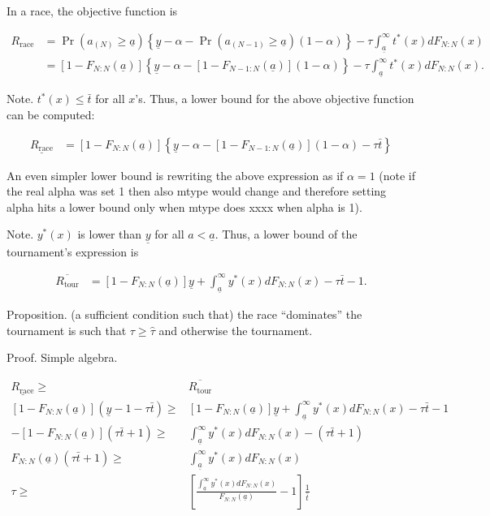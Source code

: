 \documentclass[12pt,]{article}
\newcommand\deadline{\bar{t}}
\newcommand\target{\underline{y}}
\newcommand\race{\text{race}}
\newcommand\tournament{\text{tour}}
\newcommand\mtype{\underline{a}}
\begin{document}
In a race, the objective function is

\begin{align}
R_\race & =  
  \Pr(a_{(N)}\geq \mtype) \left\{\target - \alpha -
  \Pr(a_{(N-1)}\geq \mtype) (1-\alpha) \right\}
  - \tau \int_{\mtype}^{\infty} t^*(x) dF_{N:N}(x) \nonumber\\
  & = [1-F_{N:N}(\mtype)] \left\{\target - \alpha -
  [1-F_{N-1:N}(\mtype)] (1 - \alpha) \right\}
  - \tau \int_{\mtype}^{\infty} t^*(x) dF_{N:N}(x).
\end{align}

Note. \(t^*(x) \leq \deadline\) for all \(x\)'s. Thus, a lower bound for
the above objective function can be computed:

\begin{align}
\underline {R_\race} & = 
  [1-F_{N:N}(\mtype)] \left\{\target - \alpha -
  [1-F_{N-1:N}(\mtype)] (1 - \alpha) - \tau \deadline\right\}
\end{align}

An even simpler lower bound is rewriting the above expression as if
\(\alpha=1\) (note if the real alpha was set 1 then also mtype would
change and therefore setting alpha hits a lower bound only when mtype
does xxxx when alpha is 1).

Note. \(y^*(x)\) is lower than \(\target\) for all \(a < \mtype\). Thus,
a lower bound of the tournament's expression is

\begin{align}
\overline {R_\tournament} & = 
  [1-F_{N:N}(\mtype)] \target + \int_{\mtype}^\infty y^*(x) dF_{N:N}(x) 
  - \tau \deadline - 1. 
\end{align}

Proposition. (a sufficient condition such that) the race ``dominates''
the tournament is such that \(\tau \geq \hat \tau\) and otherwise the
tournament.

Proof. Simple algebra.

\begin{align}
  \underline {R_\race} \geq & \overline {R_\tournament} \nonumber\\
  [1-F_{N:N}(\mtype)] (\target - 1 - \tau \deadline) \geq &
  [1-F_{N:N}(\mtype)] \target + \int_{\mtype}^\infty y^*(x) dF_{N:N}(x) 
  - \tau \deadline - 1 \nonumber\\
  - [1-F_{N:N}(\mtype)] (\tau\deadline + 1) \geq &
  \int_{\mtype}^\infty y^*(x) dF_{N:N}(x) 
  - (\tau \deadline + 1) \nonumber\\
  F_{N:N}(\mtype) (\tau \deadline + 1) \geq &
  \int_{\mtype}^\infty y^*(x) dF_{N:N}(x) \nonumber\\
  \tau \geq & 
    \left[
      \frac{\int_{\mtype}^\infty y^*(x) dF_{N:N}(x)}{F_{N:N}(\mtype)} -1 
    \right] \frac{1}{\deadline}
\end{align}
\end{document}
